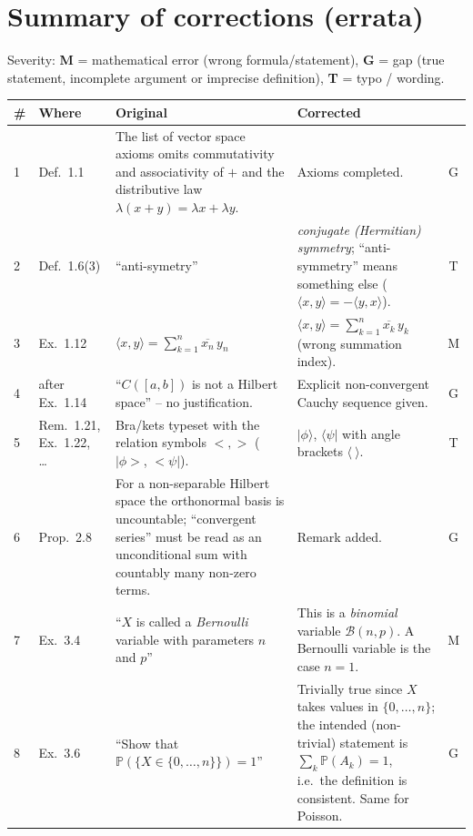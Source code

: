\documentclass[11pt,a4paper]{article}
\numberwithin{equation}{section}
\newcommand{\PP}{\mathbb{P}}
\newcommand{\ip}[2]{\langle #1, #2\rangle}
\newcommand{\ket}[1]{|#1\rangle}
\newcommand{\bra}[1]{\langle #1|}
\newcommand{\conj}[1]{\overline{#1}}
\theoremstyle{plain}
\theoremstyle{definition}
\theoremstyle{plain}
\theoremstyle{definition}
\begin{document}
\tableofcontents
\newpage
\section*{Summary of corrections (errata)}

Severity: \textbf{M} = mathematical error (wrong formula/statement),
\textbf{G} = gap (true statement, incomplete argument or imprecise definition),
\textbf{T} = typo / wording.

{\small
\renewcommand{\arraystretch}{1.25}
\setlength{\tabcolsep}{4pt}
\begin{longtable}{@{}p{0.6cm}p{1.9cm}p{5.6cm}p{6.0cm}c@{}}
\toprule
\# & Where & Original & Corrected & \\
\midrule\endhead
1 & Def.~1.1 & The list of vector space axioms omits commutativity and associativity of $+$ and the distributive law $\lambda(x+y)=\lambda x+\lambda y$. & Axioms completed. & G\\
2 & Def.~1.6(3) & ``anti-symetry'' & \emph{conjugate (Hermitian) symmetry}; ``anti-symmetry'' means something else ($\ip{x}{y}=-\ip{y}{x}$). & T\\
3 & Ex.~1.12 & $\ip{x}{y}=\sum_{k=1}^n\conj{x_n}\,y_n$ & $\ip{x}{y}=\sum_{k=1}^n\conj{x_k}\,y_k$ (wrong summation index). & M\\
4 & after Ex.~1.14 & ``$C([a,b])$ is not a Hilbert space'' -- no justification. & Explicit non-convergent Cauchy sequence given. & G\\
5 & Rem.~1.21, Ex.~1.22, \dots & Bra/kets typeset with the relation symbols $<,>$ ($|\phi>$, $<\psi|$). & $\ket{\phi}$, $\bra{\psi}$ with angle brackets $\langle\ \rangle$. & T\\
6 & Prop.~2.8 & For a non-separable Hilbert space the orthonormal basis is uncountable; ``convergent series'' must be read as an unconditional sum with countably many non-zero terms. & Remark added. & G\\
7 & Ex.~3.4 & ``$X$ is called a \emph{Bernoulli} variable with parameters $n$ and $p$'' & This is a \emph{binomial} variable $\mathcal B(n,p)$. A Bernoulli variable is the case $n=1$. & M\\
8 & Ex.~3.6 & ``Show that $\PP(\{X\in\{0,\dots,n\}\})=1$'' & Trivially true since $X$ takes values in $\{0,\dots,n\}$; the intended (non-trivial) statement is $\sum_{k}\PP(A_k)=1$, i.e.\ the definition is consistent. Same for Poisson. & G\\

\end{longtable}}
\end{document}
